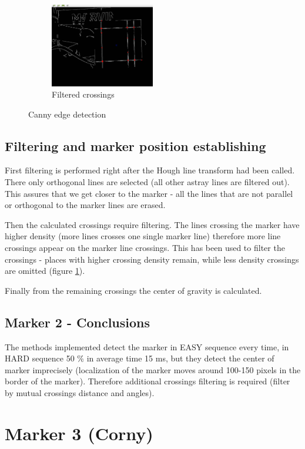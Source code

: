 \begin{figure}[ht!]
\begin{subfigure}{\textwidth}
		\centering
\includegraphics[width=0.5\textwidth]{figures/lines6}
	\caption{Filtered crossings}
	\label{fig:l6}
	\end{subfigure}
\caption{Canny edge detection}
\label{fig:linesCrossings}
\end{figure}

\subsection{Filtering and marker position establishing}
First filtering is performed right after the Hough line transform had been called. There only orthogonal lines are selected (all other astray lines are filtered out). This assures that we get closer to the marker - all the lines that are not parallel or orthogonal to the marker lines are erased.

Then the calculated crossings require filtering. The lines crossing the marker have higher density (more lines crosses one single marker line) therefore more line crossings appear on the marker line crossings. This has been used to filter the crossings - places with higher crossing density
remain, while less density crossings are omitted (figure \ref{fig:l6}). 

Finally from the remaining crossings the center of gravity
is calculated. 

\subsection{Marker 2 - Conclusions}
The methods implemented detect the marker in EASY sequence 
every time, in HARD sequence 50 \% in average time 15 ms, but they detect the center of marker imprecisely (localization of the marker moves around 100-150 pixels in the border of the marker).
Therefore additional crossings filtering is required (filter by mutual crossings distance and angles).

\newpage
\section{Marker 3 (Corny)}

